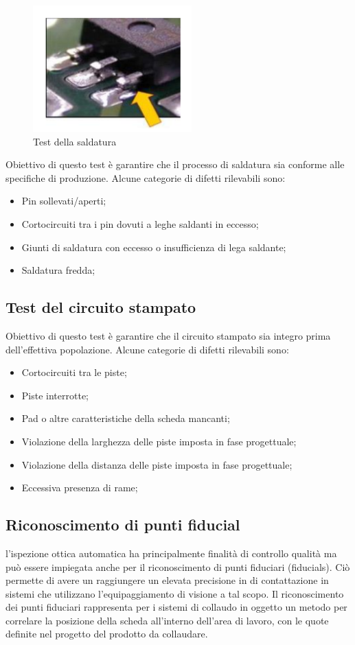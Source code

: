 \begin{figure}[!ht]
\centering
\includegraphics[width=.4\textwidth]{img/saldatura.png}
\caption{Test della saldatura}
\label{fig:presenza}
\end{figure}

Obiettivo di questo test è garantire che il processo di saldatura sia conforme alle specifiche di produzione.
Alcune categorie di difetti rilevabili sono:
\begin{itemize}
\item Pin sollevati/aperti;
\item Cortocircuiti tra i pin dovuti a leghe saldanti in eccesso;
\item Giunti di saldatura con eccesso o insufficienza di lega saldante;
\item Saldatura fredda;
\end{itemize}

\subsection{Test del circuito stampato}
Obiettivo di questo test è garantire che il circuito stampato sia integro prima dell'effettiva popolazione.
Alcune categorie di difetti rilevabili sono:
\begin{itemize}
\item Cortocircuiti tra le piste;
\item Piste interrotte;
\item Pad o altre caratteristiche della scheda mancanti;
\item Violazione della larghezza delle piste imposta in fase progettuale;
\item Violazione della distanza delle piste imposta in fase progettuale;
\item Eccessiva presenza di rame;
\end{itemize}

\subsection{Riconoscimento di punti fiducial}
l'ispezione ottica automatica ha principalmente finalità di controllo qualità ma può essere impiegata
anche per il riconoscimento di punti fiduciari (fiducials).
Ciò permette di avere un raggiungere un elevata precisione in di contattazione in sistemi che utilizzano l'equipaggiamento di visione a tal scopo.
Il riconoscimento dei punti fiduciari rappresenta
per i sistemi di collaudo in oggetto un metodo per correlare la posizione della scheda all'interno dell'area di lavoro, con le quote definite nel progetto del prodotto da collaudare.

